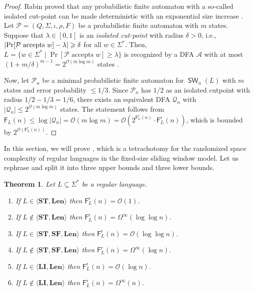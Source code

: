 \documentclass{article}\usepackage[a4paper,margin=20mm]{geometry}
\newtheorem{theorem}{Theorem}\newtheorem{lemma}[theorem]{Lemma}\newtheorem{proposition}[theorem]{Proposition}\newtheorem{corollary}[theorem]{Corollary}\newtheorem{definition}[theorem]{Definition}\newtheorem{claim}[theorem]{Claim}\newtheorem{remark}[theorem]{Remark}\newtheorem{observation}[theorem]{Observation}\newtheorem{conjecture}[theorem]{Conjecture}\newtheorem{example}[theorem]{Example}
\newcommand{\A}{\mathcal{A}}
\renewcommand{\O}{\mathcal{O}}
\renewcommand{\P}{\mathcal{P}}
\newcommand{\Q}{\mathcal{Q}}
\newcommand{\F}{\mathsf{F}}
\renewcommand{\r}{\mathsf{r}}
\DeclareMathOperator{\SW}{\mathsf{SW}}
\newcommand{\Len}{\mathbf{Len}}
\newcommand{\LI}{\mathbf{LI}}
\newcommand{\ST}{\mathbf{ST}}
\newcommand{\SF}{\mathbf{SF}}
\DeclarePairedDelimiter{\abs}{\lvert}{\rvert}
\renewcommand{\geq}{\geqslant}
\renewcommand{\leq}{\leqslant}
\renewcommand{\ge}{\geq}
\renewcommand{\le}{\leq}
\newcommand{\Omegainf}{\Omega^{\scriptscriptstyle{\infty}}}
\begin{document}
\begin{proof}
	Rabin proved that any probabilistic finite automaton with a so-called isolated cut-point
	can be made deterministic with an exponential size increase \cite{Rabin63}.
	Let $\P = (Q,\Sigma,\iota,\rho,F)$ be a probabilistic finite automaton with $m$ states.
	Suppose that $\lambda \in [0,1]$ is an {\em isolated cut-point} with radius $\delta > 0$,
	i.e.,~$\abs{\Pr[\P \text{ accepts } w] - \lambda} \ge \delta$ for all $w \in \Sigma^*$.
	Then, $L = \{ w \in \Sigma^* \mid \Pr[\P \text{ accepts } w] \ge \lambda \}$
	is recognized by a DFA $\A$ with at most $(1 + m/\delta)^{m-1} = 2^{\O(m \log m)}$ states
	\cite[Theorem~3]{Rabin63}.

	Now, let $\P_n$ be a minimal probabilistic finite automaton for $\SW_n(L)$ with $m$ states and error probability $\leq 1/3$.
	Since $\P_n$ has $1/2$ as an isolated cutpoint with radius $1/2-1/3 = 1/6$,
	there exists an equivalent DFA $\Q_n$ with $|\Q_n| \le 2^{\O(m \log m)}$ states.
	The statement follows from
	$\F_L(n) \le \log |\Q_n| = \O(m \log m) = \O(2^{\F^\r_L(n)} \cdot \F^\r_L(n))$,
	which is bounded by $2^{\O(\F^\r_L(n))}$.
\end{proof}

In this section, we will prove ,
which is a tetrachotomy for the randomized space complexity of regular languages
in the fixed-size sliding window model.
Let us rephrase  and split it into three upper bounds and three lower bounds.

\begin{theorem}\label{thm:tetrachotomy}
	Let $L \subseteq \Sigma^*$ be a regular language.
	\begin{enumerate}[label=(\arabic{*}), ref=(\arabic{*})]
	\item \label{point-O(1)} If $L \in \langle \ST, \Len \rangle$
	then $\F^\r_L(n) = \O(1)$.
	\item \label{lower-loglog} If $L \notin \langle \ST, \Len \rangle$
	then $\F^\r_L(n) = \Omegainf(\log \log n)$.
	\item \label{upper-loglog} If $L \in \langle \ST, \SF, \Len \rangle$
	then $\F^\r_L(n) = \O(\log \log n)$.
	\item \label{lower-log} If $L \notin \langle \ST, \SF, \Len \rangle$
	then $\F^\r_L(n) = \Omegainf(\log n)$.
	\item \label{point-O(log)} If $L \in \langle \LI, \Len \rangle$
	then $\F^\r_L(n) = \O(\log n)$.
	\item \label{lower-lin} If $L \notin \langle \LI, \Len \rangle$
	then $\F^\r_L(n) = \Omegainf(n)$.
	\end{enumerate}
\end{theorem}
\end{document}
